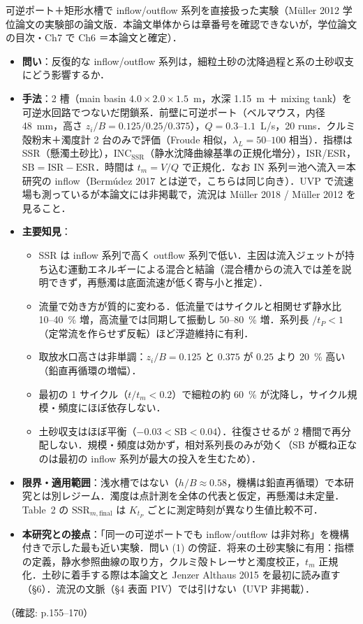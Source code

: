 \documentclass[11pt]{jsarticle}
\newcommand{\litref}[1]{{\large\bfseries\color{citecolor}#1}}
\begin{document}
\noindent\litref{M\"uller et al. (2017)}\quad 可逆ポート＋矩形水槽で inflow/outflow 系列を直接扱った実験（M\"uller 2012 学位論文の実験部の論文版．本論文単体からは章番号を確認できないが，学位論文の目次・Ch7 で Ch6 ＝本論文と確定）．
\begin{itemize}
  \item \textbf{問い}：反復的な inflow/outflow 系列は，細粒土砂の沈降過程と系の土砂収支にどう影響するか．
  \item \textbf{手法}：2 槽（main basin $4.0 \times 2.0 \times 1.5$~m，水深 1.15~m ＋ mixing tank）を可逆水回路でつないだ閉鎖系．前壁に可逆ポート（ベルマウス，内径 48~mm，高さ $z_i/B = 0.125/0.25/0.375$），$Q = 0.3$--$1.1$~L/s，20 runs．クルミ殻粉末＋濁度計 2 台のみで評価（Froude 相似，$\lambda_L = 50$--$100$ 相当）．指標は SSR（懸濁土砂比），$\mathrm{INC}_\mathrm{SSR}$（静水沈降曲線基準の正規化増分），ISR/ESR，$\mathrm{SB} = \mathrm{ISR} - \mathrm{ESR}$．時間は $t_m = V/Q$ で正規化．なお IN 系列＝池へ流入＝本研究の inflow（Berm\'udez 2017 とは逆で，こちらは同じ向き）．UVP で流速場も測っているが本論文には非掲載で，流況は M\"uller 2018 / M\"uller 2012 を見ること．
  \item \textbf{主要知見}：
  \begin{itemize}
    \item SSR は inflow 系列で高く outflow 系列で低い．主因は流入ジェットが持ち込む運動エネルギーによる混合と結論（混合槽からの流入では差を説明できず，再懸濁は底面流速が低く寄与小と推定）．
    \item 流量で効き方が質的に変わる．低流量ではサイクルと相関せず静水比 10--40~\% 増，高流量では同期して振動し 50--80~\% 増．系列長 $/t_P < 1$（定常流を作らせず反転）ほど浮遊維持に有利．
    \item 取放水口高さは非単調：$z_i/B = 0.125$ と $0.375$ が $0.25$ より 20~\% 高い（鉛直再循環の増幅）．
    \item 最初の 1 サイクル（$t/t_m < 0.2$）で細粒の約 60~\% が沈降し，サイクル規模・頻度にほぼ依存しない．
    \item 土砂収支はほぼ平衡（$-0.03 < \mathrm{SB} < 0.04$）．往復させるが 2 槽間で再分配しない．規模・頻度は効かず，相対系列長のみが効く（SB が概ね正なのは最初の inflow 系列が最大の投入を生むため）．
  \end{itemize}
  \item \textbf{限界・適用範囲}：浅水槽ではない（$h/B \approx 0.58$，機構は鉛直再循環）で本研究とは別レジーム．濁度は点計測を全体の代表と仮定，再懸濁は未定量．Table~2 の $\mathrm{SSR}_{m,\mathrm{final}}$ は $K_{t_P}$ ごとに測定時刻が異なり生値比較不可．
  \item \textbf{本研究との接点}：「同一の可逆ポートでも inflow/outflow は非対称」を機構付きで示した最も近い実験．問い (1) の傍証．将来の土砂実験に有用：指標の定義，静水参照曲線の取り方，クルミ殻トレーサと濁度校正，$t_m$ 正規化．土砂に着手する際は本論文と Jenzer Althaus 2015 を最初に読み直す（§6）．流況の文脈（§4 表面 PIV）では引けない（UVP 非掲載）．
\end{itemize}
\noindent（確認: p.155--170）
\end{document}
